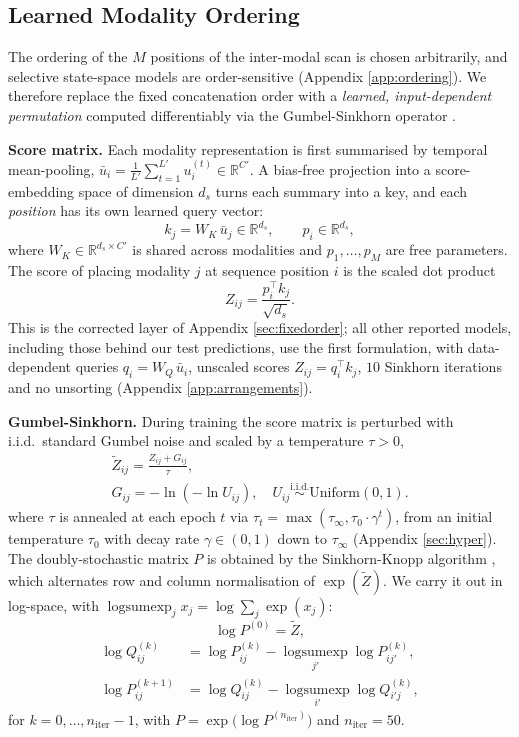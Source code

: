 \documentclass[10pt,a4paper,twocolumn]{article}
\newcommand{\R}{\mathbb{R}}
\begin{document}
	\subsection{Learned Modality Ordering}
	\label{sec:ordering}
	\label{sec:gumbel}
	The ordering of the $M$ positions of the inter-modal scan is chosen arbitrarily, and selective state-space models are order-sensitive (Appendix \ref{app:ordering}). We therefore replace the fixed concatenation order with a \emph{learned, input-dependent permutation} computed differentiably via the Gumbel-Sinkhorn operator \cite{mena2018}.
	
	\textbf{Score matrix.} Each modality representation is first summarised by temporal mean-pooling, $\bar{u}_i = \frac{1}{L'}\sum_{t=1}^{L'} u_i^{(t)} \in \R^{C'}$. A bias-free projection into a score-embedding space of dimension $d_s$ turns each summary into a key, and each \emph{position} has its own learned query vector:
	$$k_j = W_K\,\bar{u}_j \in \R^{d_s}, \qquad p_i \in \R^{d_s},$$
	where $W_K \in \R^{d_s \times C'}$ is shared across modalities and $p_1, \dots, p_M$ are free parameters. The score of placing modality $j$ at sequence position $i$ is the scaled dot product
	$$Z_{ij} = \frac{p_i^\top k_j}{\sqrt{d_s}} .$$
	This is the corrected layer of Appendix \ref{sec:fixedorder}; all other reported models, including those behind our test predictions, use the first formulation, with data-dependent queries $q_i = W_Q\,\bar{u}_i$, unscaled scores $Z_{ij} = q_i^\top k_j$, $10$ Sinkhorn iterations and no unsorting (Appendix \ref{app:arrangements}).
	
	\textbf{Gumbel-Sinkhorn.} During training the score matrix is perturbed with i.i.d.\ standard Gumbel noise and scaled by a temperature $\tau > 0$,
	$$\begin{gathered}\tilde{Z}_{ij} = \frac{Z_{ij} + G_{ij}}{\tau}, \\ G_{ij} = -\ln(-\ln U_{ij}), \quad U_{ij} \overset{\text{i.i.d.}}{\sim} \mathrm{Uniform}(0,1).\end{gathered}$$
	where $\tau$ is annealed at each epoch $t$ via $\tau_t = \max(\tau_\infty, \tau_0 \cdot \gamma^t)$, from an initial temperature $\tau_0$ with decay rate $\gamma \in (0, 1)$ down to $\tau_\infty$ (Appendix \ref{sec:hyper}). The doubly-stochastic matrix $P$ is obtained by the Sinkhorn-Knopp algorithm \cite{mena2018}, which alternates row and column normalisation of $\exp(\tilde{Z})$. We carry it out in log-space, with $\operatorname{logsumexp}_j x_j = \log \sum_j \exp(x_j)$:
	$$ \log P^{(0)} = \tilde{Z}, $$
	$$\begin{aligned} \log Q^{(k)}_{ij} &= \log P^{(k)}_{ij} - \operatorname*{logsumexp}_{j'} \log P^{(k)}_{ij'},
	\\
	\log P^{(k+1)}_{ij} &= \log Q^{(k)}_{ij} - \operatorname*{logsumexp}_{i'} \log Q^{(k)}_{i'j}, \end{aligned}$$
	for $k = 0,\dots,n_{\text{iter}}-1$, with $P = \exp\bigl(\log P^{(n_{\text{iter}})}\bigr)$ and $n_{\text{iter}} = 50$.
	
\end{document}
